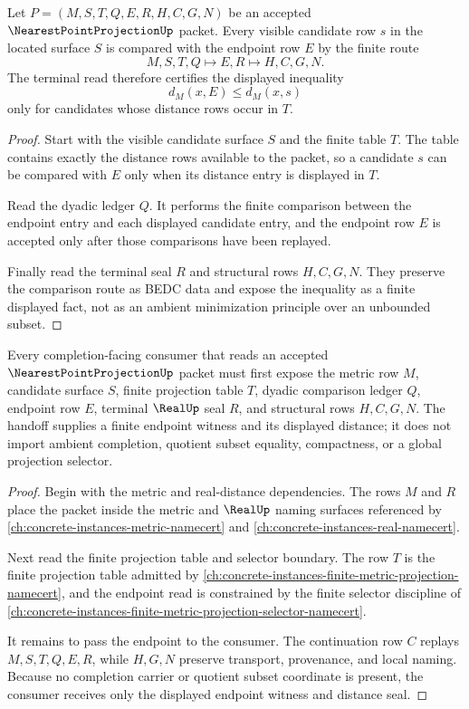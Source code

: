 \begin{theorem}
\label{thm:nearest-point-projection-distance-minimality}
Let $P=(M,S,T,Q,E,R,H,C,G,N)$ be an accepted $\NearestPointProjectionUp$ packet. Every visible candidate row $s$ in the located surface $S$ is compared with the endpoint row $E$ by the finite route
$$
M,S,T,Q \longmapsto E,R \longmapsto H,C,G,N .
$$
The terminal read therefore certifies the displayed inequality
$$
d_M(x,E) \leq d_M(x,s)
$$
only for candidates whose distance rows occur in $T$.
\end{theorem}
\begin{proof}
Start with the visible candidate surface $S$ and the finite table $T$. The table contains exactly the distance rows available to the packet, so a candidate $s$ can be compared with $E$ only when its distance entry is displayed in $T$.

Read the dyadic ledger $Q$. It performs the finite comparison between the endpoint entry and each displayed candidate entry, and the endpoint row $E$ is accepted only after those comparisons have been replayed.

Finally read the terminal seal $R$ and structural rows $H,C,G,N$. They preserve the comparison route as BEDC data and expose the inequality as a finite displayed fact, not as an ambient minimization principle over an unbounded subset.
\end{proof}

\begin{theorem}
\label{thm:nearest-point-projection-completion-handoff}
Every completion-facing consumer that reads an accepted $\NearestPointProjectionUp$ packet must first expose the metric row $M$, candidate surface $S$, finite projection table $T$, dyadic comparison ledger $Q$, endpoint row $E$, terminal $\RealUp$ seal $R$, and structural rows $H,C,G,N$. The handoff supplies a finite endpoint witness and its displayed distance; it does not import ambient completion, quotient subset equality, compactness, or a global projection selector.
\end{theorem}
\begin{proof}
Begin with the metric and real-distance dependencies. The rows $M$ and $R$ place the packet inside the metric and $\RealUp$ naming surfaces referenced by \autoref{ch:concrete-instances-metric-namecert} and \autoref{ch:concrete-instances-real-namecert}.

Next read the finite projection table and selector boundary. The row $T$ is the finite projection table admitted by \autoref{ch:concrete-instances-finite-metric-projection-namecert}, and the endpoint read is constrained by the finite selector discipline of \autoref{ch:concrete-instances-finite-metric-projection-selector-namecert}.

It remains to pass the endpoint to the consumer. The continuation row $C$ replays $M,S,T,Q,E,R$, while $H,G,N$ preserve transport, provenance, and local naming. Because no completion carrier or quotient subset coordinate is present, the consumer receives only the displayed endpoint witness and distance seal.
\end{proof}

